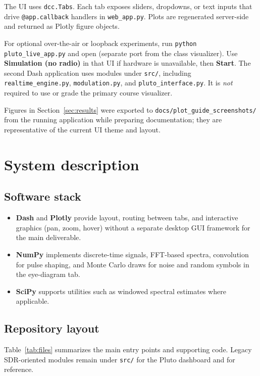 \documentclass[11pt,a4paper]{article}
\begin{document}
The UI uses \texttt{dcc.Tabs}. Each tab exposes sliders, dropdowns, or text inputs that drive \texttt{@app.callback} handlers in \texttt{web\_app.py}. Plots are regenerated server-side and returned as Plotly figure objects.

For optional over-the-air or loopback experiments, run \texttt{python pluto\_live\_app.py} and open  (separate port from the class visualizer). Use \textbf{Simulation (no radio)} in that UI if hardware is unavailable, then \textbf{Start}. The second Dash application uses modules under \texttt{src/}, including \texttt{realtime\_engine.py}, \texttt{modulation.py}, and \texttt{pluto\_interface.py}. It is \emph{not} required to use or grade the primary course visualizer.

Figures in Section~\ref{sec:results} were exported to \texttt{docs/plot\_guide\_screenshots/} from the running application while preparing documentation; they are representative of the current UI theme and layout.

\section{System description}

\subsection{Software stack}
\begin{itemize}
    \item \textbf{Dash} and \textbf{Plotly} provide layout, routing between tabs, and interactive graphics (pan, zoom, hover) without a separate desktop GUI framework for the main deliverable.
    \item \textbf{NumPy} implements discrete-time signals, FFT-based spectra, convolution for pulse shaping, and Monte Carlo draws for noise and random symbols in the eye-diagram tab.
    \item \textbf{SciPy} supports utilities such as windowed spectral estimates where applicable.
\end{itemize}

\subsection{Repository layout}
Table~\ref{tab:files} summarizes the main entry points and supporting code. Legacy SDR-oriented modules remain under \texttt{src/} for the Pluto dashboard and for reference.
\end{document}
